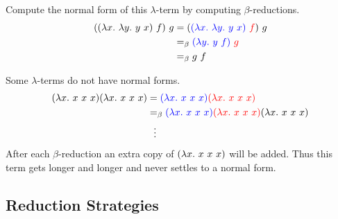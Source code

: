 \documentclass{book}
\begin{document}
    \begin{eg}
        Compute the normal form of this $\lambda$-term by computing $\beta$-reductions. 
        \begin{align*}
            ((\lambda x. \ \lambda y. \ y \ x) \ f) \ g &= (\textcolor{blue}{(\lambda x. \ \lambda y. \ y \ x)} \textcolor{red}{ \ f}) \ g \\
            &=_{\beta} \textcolor{blue}{(\lambda y. \ y \ f)} \textcolor{red}{ \ g} \\
            &=_{\beta} g \ f
        \end{align*}
    \end{eg}

    \begin{eg}
        Some $\lambda$-terms do not have normal forms. 
        \begin{align*}
            (\lterm{x}{x \ x \ x})(\lterm{x}{x \ x \ x}) &= \lamabsarg{(\lterm{x}{x \ x \ x})}{(\lterm{x}{x \ x \ x})} \\
            &\beq \lamabsarg{(\lterm{x}{x \ x \ x})}{(\lterm{x}{x \ x \ x})} (\lterm{x}{x \ x \ x})\\
            & \ \ \vdots
        \end{align*}
        After each $\beta$-reduction an extra copy of $(\lterm{x}{x \ x \ x})$ will be added. Thus this term gets longer and longer and never settles to a normal form. 
    \end{eg}

    \subsection*{Reduction Strategies}
\end{document}
